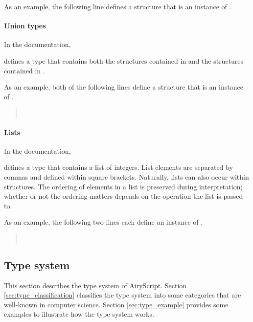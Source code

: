 As an example, the following line defines a structure that is an instance of
.
\begin{quote}
\end{quote}

\paragraph{Union types}
In the documentation,
\begin{quote}
\end{quote}
defines a type that contains both the structures contained in  and the
structures contained in .

As an example, both of the following lines define a structure that is an
instance of .
\begin{quote}
  \\
\end{quote}


\paragraph{Lists}
In the documentation,
\begin{quote}
  \tye{ = [Int]}
\end{quote}
defines a type that contains a list of integers. List elements are separated
by commas and defined within square brackets. Naturally, lists can also occur
within structures. The ordering of elements in a list is preserved during
interpretation; whether or not the ordering matters depends on the operation the
list is passed to.

As an example, the following two lines each define an instance of .
\begin{quote}
  \tye{[1,2,3,4]}\\
  \tye{[   5 , 2,1,2]}
\end{quote}


\subsection{Type system}
\label{sec:structural_type_system}
This section describes the type system of AiryScript. Section
\ref{sec:type_classification} classifies the type system into some categories
that are well-known in computer science. Section \ref{sec:type_example} provides
some examples to illustrate how the type system works.

